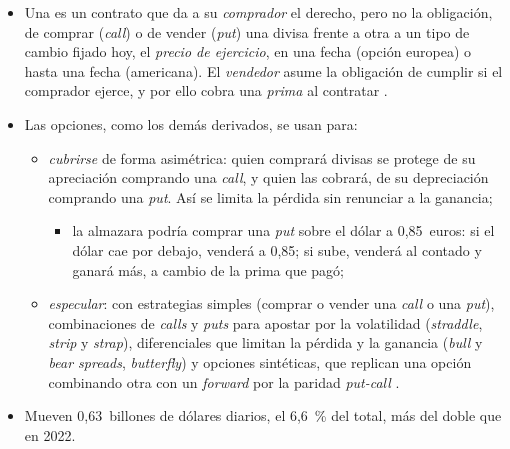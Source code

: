 \documentclass[11pt]{article}
\begin{document}
\begin{itemize}
\item Una  es un contrato que da a su \emph{comprador} el derecho, pero no la obligación, de comprar (\emph{call}) o de vender (\emph{put}) una divisa frente a otra a un tipo de cambio fijado hoy, el \emph{precio de ejercicio}, en una fecha (opción europea) o hasta una fecha (americana). El \emph{vendedor} asume la obligación de cumplir si el comprador ejerce, y por ello cobra una \emph{prima} al contratar\nocite{Hull2022Options} .
\item Las opciones, como los demás derivados, se usan para:
  \begin{itemize}
  \item \emph{cubrirse} de forma asimétrica: quien comprará divisas se protege de su apreciación comprando una \emph{call}, y quien las cobrará, de su depreciación comprando una \emph{put}. Así se limita la pérdida sin renunciar a la ganancia;
    \begin{itemize}
    \item la almazara podría comprar una \emph{put} sobre el dólar a 0,85~euros: si el dólar cae por debajo, venderá a 0,85; si sube, venderá al contado y ganará más, a cambio de la prima que pagó;
    \end{itemize}
  \item \emph{especular}: con estrategias simples (comprar o vender una \emph{call} o una \emph{put}), combinaciones de \emph{calls} y \emph{puts} para apostar por la volatilidad (\emph{straddle}, \emph{strip} y \emph{strap}), diferenciales que limitan la pérdida y la ganancia (\emph{bull} y \emph{bear spreads}, \emph{butterfly}) y opciones sintéticas, que replican una opción combinando otra con un \emph{forward} por la paridad \emph{put-call} .
  \end{itemize}
\item Mueven 0,63~billones de dólares diarios, el 6,6~\% del total, más del doble que en 2022\nocite{HuangKrohnSushko2025FX}.
\end{itemize}
\end{document}
